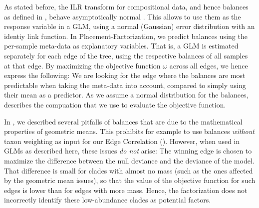 As stated before, the ILR transform for compositional data,
and hence balances as defined in ,
behave asymptotically normal \cite{Egozcue2003,Pawlowsky-Glahn2011a}.
This allows to use them as the response variable in a \ac{GLM},
using a normal (Gaussian) error distribution with an identiy link function.
In Placement-Factorization, we predict balances using the per-sample meta-data as explanatory variables.
That is, a \ac{GLM} is estimated separately for each edge of the tree,
using the respective balances of all samples at that edge.
By maximizing the objective function $\omega$ across all edges, we hence express the following:
We are looking for the edge where the balances are most predictable when taking the meta-data into account,
compared to simply using their mean as a predictor.
As we assume a normal distribution for the balances,
 describes the compuation that we use to evaluate the objective function.

In , we described several pitfalls of balances
that are due to the mathematical properties of geometric means.
This prohibits for example to use balances \emph{without} taxon weighting
as input for our Edge Correlation ().
However, when used in \acp{GLM} as described here, these issues \emph{do not} arise:
The winning edge is chosen to maximize the difference between the null deviance and the deviance of the model.
That difference is small for clades with almost no mass (such as the ones affected by the geometric mean issues),
so that the value of the objective function for such edges is lower than for edges with more mass.
Hence, the factorization does not incorrectly identify these low-abundance clades as potential factors.



